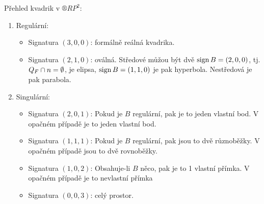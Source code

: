 \documentclass[12pt]{article}					%
\begin{document}
\begin{tvrzeni}
	Přehled kvadrik v $®RP^2$:
	\begin{enumerate}
		\item Regulární:
			\begin{itemize}
				\item Signatura $(3, 0, 0)$: formálně reálná kvadrika.
				\item Signatura $(2, 1, 0)$: oválná. Středové můžou být dvě $\operatorname{sign} B = (2, 0, 0)$, tj. $Q_F \cap n = \emptyset$, je elipsa, $\operatorname{sign} B = (1, 1, 0)$ je pak hyperbola. Nestředová je pak parabola.
			\end{itemize}
		\item Singulární:
			\begin{itemize}
				\item Signatura $(2, 0, 1)$: Pokud je $B$ regulární, pak je to jeden vlastní bod. V opačném případě je to jeden vlastní bod.
				\item Signatura $(1, 1, 1)$: Pokud je $B$ regulární, pak jsou to dvě různoběžky. V opačném případě jsou to dvě rovnoběžky.
				\item Signatura $(1, 0, 2)$: Obsahuje-li $B$ něco, pak je to 1 vlastní přímka. V opačném případě je to nevlastní přímka
				\item Signatura $(0, 0, 3)$: celý prostor.
			\end{itemize}
	\end{enumerate}
\end{tvrzeni}

\end{document}
